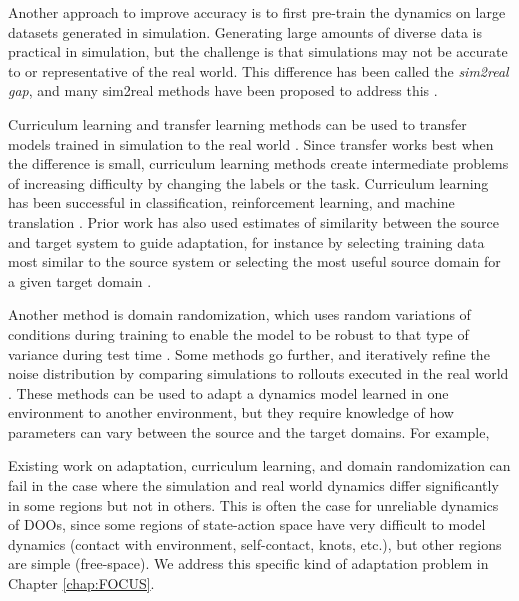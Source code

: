 Another approach to improve accuracy is to first pre-train the dynamics on large datasets generated in simulation. Generating large amounts of diverse data is practical in simulation, but the challenge is that simulations may not be accurate to or representative of the real world. This difference has been called the \textit{sim2real gap}, and many sim2real methods have been proposed to address this \cite{sim2realDynamics2018,sim2realDynamics2018,PushSim2021,real2sim2real,sim2real2sim}.

Curriculum learning and transfer learning methods can be used to transfer models trained in simulation to the real world \cite{curriculumBengio09,sorocky2020experience, torrey2010transfer}. Since transfer works best when the difference is small, curriculum learning methods create intermediate problems of increasing difficulty by changing the labels or the task. Curriculum learning has been successful in classification, reinforcement learning, and machine translation \cite{gradualAdaptation20, zhang2017curriculum, zhan2021meta, curriculumDeepRL20}. Prior work has also used estimates of similarity between the source and target system to guide adaptation, for instance by selecting training data most similar to the source system \cite{sorocky2020experience} or selecting the most useful source domain for a given target domain \cite{courchesne2021onassessing}.

Another method is domain randomization, which uses random variations of conditions during training to enable the model to be robust to that type of variance during test time \cite{lowrey2018reinforcement}. Some methods go further, and iteratively refine the noise distribution by comparing simulations to rollouts executed in the real world \cite{chebotar2019closing, langsfeld2018selection}. These methods can be used to adapt a dynamics model learned in one environment to another environment, but they require knowledge of how parameters can vary between the source and the target domains. For example,

Existing work on adaptation, curriculum learning, and domain randomization can fail in the case where the simulation and real world dynamics differ significantly in some regions but not in others. This is often the case for unreliable dynamics of DOOs, since some regions of state-action space have very difficult to model dynamics (contact with environment, self-contact, knots, etc.), but other regions are simple (free-space). We address this specific kind of adaptation problem in Chapter \ref{chap:FOCUS}.

